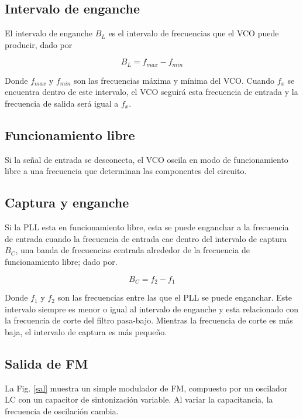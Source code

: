 \documentclass[10pt,a4paper]{IEEEtran}
\begin{document}
    \subsection{Intervalo de enganche}
    El intervalo de enganche $B_L$ es el intervalo de frecuencias que el VCO puede producir, dado por 
    
    \begin{equation}\label{bl}
    B_L = f_{max}-f_{min} 
    \end{equation}
    
    Donde $f_{max}$ y $f_{min}$ son las frecuencias máxima y mínima del VCO.
    Cuando $f_x$ se encuentra dentro de este intervalo, el VCO seguirá esta frecuencia de entrada y la frecuencia de salida será igual a $f_x$.
    
    \subsection{Funcionamiento libre}
    Si la señal de entrada se desconecta, el VCO oscila en modo de funcionamiento libre a una frecuencia que determinan las componentes del circuito. 
    
    \subsection{Captura y enganche}
    Si la PLL esta en funcionamiento libre, esta se 
    puede enganchar a la frecuencia de entrada cuando la frecuencia de entrada cae dentro del intervalo de captura $B_C$, una banda de frecuencias centrada alrededor de la frecuencia de funcionamiento libre; dado por.
    
    \begin{equation}\label{bc}
    B_C = f_{2}-f_{1} 
    \end{equation}
    
    Donde $f_{1}$ y $f_{2}$ son las frecuencias entre las que el PLL se puede enganchar. Este intervalo siempre es menor o igual al intervalo de enganche y esta relacionado con la frecuencia de corte del filtro pasa-bajo. Mientras la frecuencia de corte es más baja, el intervalo de captura es más pequeño.
    
    \subsection{Salida de FM}
    La Fig. \ref{sal} muestra un simple modulador de FM, compuesto por un oscilador LC con un capacitor de sintonización variable. Al variar la capacitancia, la frecuencia de oscilación cambia.
    
\end{document}
